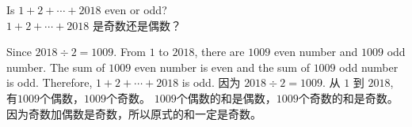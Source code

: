 \begin{example}
Is $1+2+\cdots+2018$ even or odd? \\
$1+2+\cdots+2018$ 是奇数还是偶数？
\end{example}
\begin{solution}
\begin{paracol}{2}
Since $2018\div 2 = 1009$. From $1$ to $2018$, there are $1009$ even number and $1009$ odd number. The sum of $1009$ even number is even and the sum of  $1009$ odd number is odd. Therefore, $1+2+\cdots+2018$  is odd.
\switchcolumn
因为 $2018\div 2 = 1009$. 从 $1$ 到 $2018$, 有$1009$个偶数，$1009$个奇数。 $1009$个偶数的和是偶数，$1009$个奇数的和是奇数。因为奇数加偶数是奇数，所以原式的和一定是奇数。
\end{paracol}
\end{solution}
\newpage
